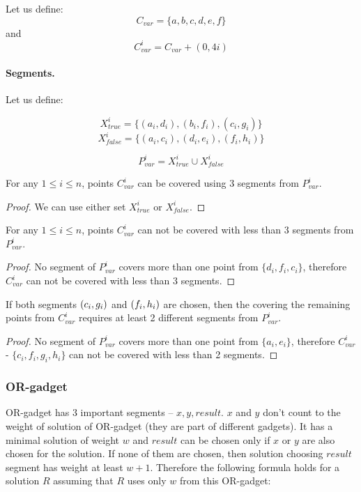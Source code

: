 Let us define: $$C_{var} =  \{a, b, c, d, e, f\}$$
and $$C_{var}^i = C_{var} + (0, 4i)$$


\paragraph{Segments.}

Let us define:

$$X_{true}^i =\{ (a_i, d_i), (b_i, f_i), (c_i, g_i)\}$$
$$X_{false}^i = \{(a_i, c_i), (d_i, e_i), (f_i, h_i)\}$$

$$P_{var}^i = X_{true}^i \cup X_{false}^i$$


\begin{lemma}
\label{choose_variables_solution}
For any $1 \le i \le n$, points $C_{var}^i$
can be covered using 3 segments from $P_{var}^i$.
\end{lemma}

\begin{proof}
We can use either set $X_{true}^i$ or $X_{false}^i$.
\end{proof}

\begin{lemma}
\label{choose_variables_no_less}
For any $1 \le i \le n$, points $C_{var}^i$
can not be covered with less than 3 segments from $P_{var}^i$.
\end{lemma}

\begin{proof}
No segment of $P_{var}^i$ covers more than one point from
$\{d_i, f_i, c_i\}$, therefore $C_{var}^i$ can
not be covered with less than 3 segments.
\end{proof}

\begin{lemma}
\label{choose_variables_both}
If both segments $(c_i, g_i)$ and $(f_i, h_i)$ are chosen, then
the covering the remaining points from $C_{var}^i$
requires at least 2 different
segments from $P_{var}^i$.
\end{lemma}
\begin{proof}
No segment of $P_{var}^i$ covers more than one point from
$\{a_i, e_i\}$,
therefore 
$C_{var}^i$ - $\{c_i, f_i, g_i, h_i\}$
can not be covered with less than 2 segments.
\end{proof}


\subsubsection{OR-gadget}

OR-gadget has 3 important segments
-- $x, y, result$. $x$ and $y$ don't count to the weight of solution
of OR-gadget (they are part of different gadgets).
It has a minimal solution of weight $w$
and $result$ can be chosen only if $x$ or $y$ are also chosen
for the solution.
If none of them are chosen, then solution
choosing $result$ segment has weight at least $w+1$.
Therefore the following formula holds for a solution $R$
assuming that $R$ uses only $w$ from this OR-gadget:

